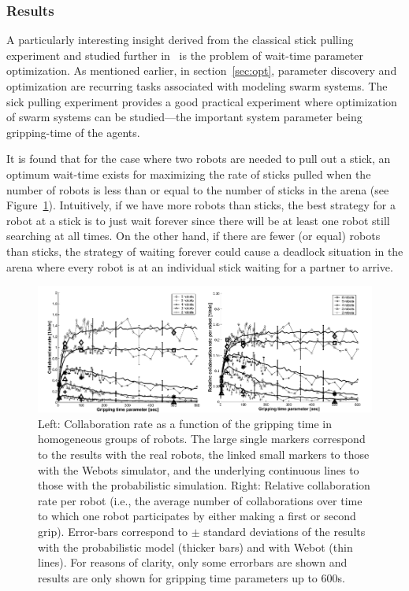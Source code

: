 \documentclass[Main.tex]{subfiles}
\begin{document}
\subsubsection*{Results}
A particularly interesting insight derived from the classical stick pulling experiment and studied further in~\cite{Ijspeert2001} is the problem of wait-time parameter optimization. As mentioned earlier, in section~\ref{sec:opt}, parameter discovery and optimization are recurring tasks associated with modeling swarm systems. The sick pulling experiment provides a good practical experiment where optimization of swarm systems can be studied---the important system parameter being gripping-time of the agents.

It is found that for the case where two robots are needed to pull out a stick, an optimum wait-time exists for maximizing the rate of sticks pulled when the number of robots is less than or equal to the number of sticks in the arena (see Figure~\ref{fig:stickopt}). Intuitively, if we have more robots than sticks, the best strategy for a robot at a stick is to just wait forever since there will be at least one robot still searching at all times. On the other hand, if there are fewer (or equal) robots than sticks, the strategy of waiting forever could cause a deadlock situation in the arena where every robot is at an individual stick waiting for a partner to arrive.

\begin{figure}[!ht]
\centering\includegraphics[width=.85\textwidth]{assets/stickopt.png}
\centering\caption{Left: Collaboration rate as a function of the gripping time in homogeneous groups of robots. The large single markers correspond to the results with the real robots, the linked small markers to those with the Webots simulator, and the underlying continuous lines to those with the probabilistic simulation. Right: Relative collaboration rate per robot (i.e., the average number of collaborations over time to which one robot participates by either making a first or second grip). Error-bars correspond to $\pm$ standard deviations of the results with the probabilistic model (thicker bars) and with Webot (thin lines). For reasons of clarity, only some errorbars are shown and results are only shown for gripping time parameters up to 600s.}\label{fig:stickopt}
\end{figure}
\end{document}
